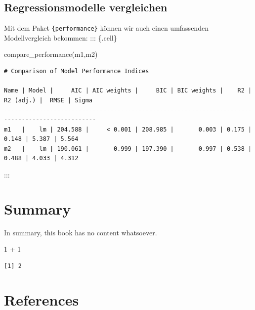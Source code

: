 \documentclass[
  letterpaper,
  DIV=11,
  numbers=noendperiod]{scrreprt}
\newenvironment{Shaded}{\begin{snugshade}}{\end{snugshade}}
\newcommand{\DecValTok}[1]{\textcolor[rgb]{0.68,0.00,0.00}{#1}}
\newcommand{\FunctionTok}[1]{\textcolor[rgb]{0.28,0.35,0.67}{#1}}
\newcommand{\NormalTok}[1]{\textcolor[rgb]{0.00,0.46,0.62}{#1}}
\newcommand{\SpecialCharTok}[1]{\textcolor[rgb]{0.37,0.37,0.37}{#1}}
\newlength{\cslhangindent}
\newlength{\cslentryspacingunit} %
\newenvironment{CSLReferences}[2] %
 {%
  \setlength{\parindent}{0pt}
  \ifodd #1
  \let\oldpar\par
  \def\par{\hangindent=\cslhangindent\oldpar}
  \fi
  \setlength{\parskip}{#2\cslentryspacingunit}
 }%
 {}
\begin{document}
\hypertarget{regressionsmodelle-vergleichen}{%
\section{Regressionsmodelle
vergleichen}\label{regressionsmodelle-vergleichen}}

Mit dem Paket \texttt{\{performance\}} können wir auch einen umfassenden
Modellvergleich bekommen: ::: \{.cell\}

\begin{Shaded}
\begin{Highlighting}[]
\FunctionTok{compare\_performance}\NormalTok{(m1,m2)}
\end{Highlighting}
\end{Shaded}

\begin{verbatim}
# Comparison of Model Performance Indices

Name | Model |     AIC | AIC weights |     BIC | BIC weights |    R2 | R2 (adj.) |  RMSE | Sigma
------------------------------------------------------------------------------------------------
m1   |    lm | 204.588 |     < 0.001 | 208.985 |       0.003 | 0.175 |     0.148 | 5.387 | 5.564
m2   |    lm | 190.061 |       0.999 | 197.390 |       0.997 | 0.538 |     0.488 | 4.033 | 4.312
\end{verbatim}

:::

\hypertarget{summary}{%
\chapter{Summary}\label{summary}}

In summary, this book has no content whatsoever.

\begin{Shaded}
\begin{Highlighting}[]
\DecValTok{1} \SpecialCharTok{+} \DecValTok{1}
\end{Highlighting}
\end{Shaded}

\begin{verbatim}
[1] 2
\end{verbatim}

\hypertarget{references}{%
\chapter*{References}\label{references}}

\hypertarget{refs}{}
\begin{CSLReferences}{0}{0}
\end{CSLReferences}
\end{document}
